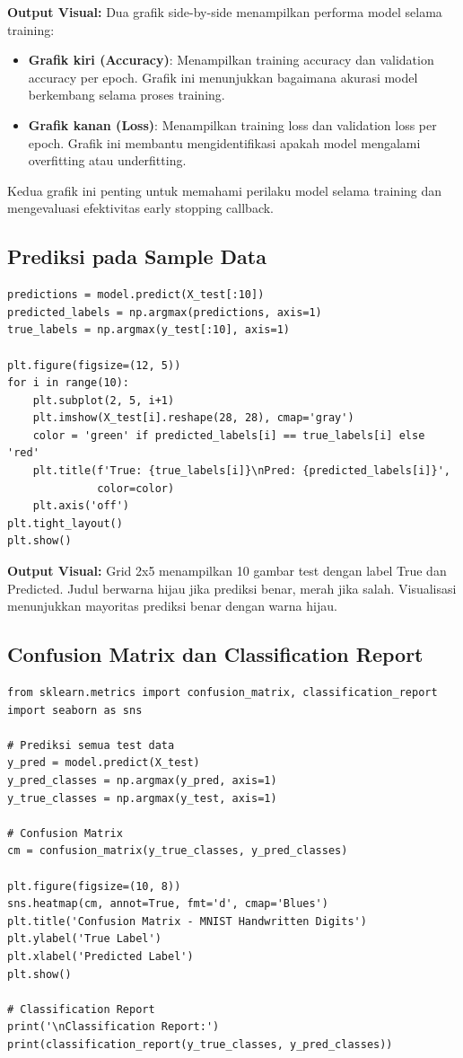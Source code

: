 \documentclass[12pt,a4paper]{article}
\begin{document}
\textbf{Output Visual:} Dua grafik side-by-side menampilkan performa model selama training:
\begin{itemize}
    \item \textbf{Grafik kiri (Accuracy)}: Menampilkan training accuracy dan validation accuracy per epoch. Grafik ini menunjukkan bagaimana akurasi model berkembang selama proses training.
    \item \textbf{Grafik kanan (Loss)}: Menampilkan training loss dan validation loss per epoch. Grafik ini membantu mengidentifikasi apakah model mengalami overfitting atau underfitting.
\end{itemize}

Kedua grafik ini penting untuk memahami perilaku model selama training dan mengevaluasi efektivitas early stopping callback.

\subsection{Prediksi pada Sample Data}

\begin{lstlisting}[caption=Visualisasi Prediksi]
predictions = model.predict(X_test[:10])
predicted_labels = np.argmax(predictions, axis=1)
true_labels = np.argmax(y_test[:10], axis=1)

plt.figure(figsize=(12, 5))
for i in range(10):
    plt.subplot(2, 5, i+1)
    plt.imshow(X_test[i].reshape(28, 28), cmap='gray')
    color = 'green' if predicted_labels[i] == true_labels[i] else 'red'
    plt.title(f'True: {true_labels[i]}\nPred: {predicted_labels[i]}', 
              color=color)
    plt.axis('off')
plt.tight_layout()
plt.show()
\end{lstlisting}

\textbf{Output Visual:} Grid 2x5 menampilkan 10 gambar test dengan label True dan Predicted. Judul berwarna hijau jika prediksi benar, merah jika salah. Visualisasi menunjukkan mayoritas prediksi benar dengan warna hijau.

\subsection{Confusion Matrix dan Classification Report}

\begin{lstlisting}[caption=Confusion Matrix dan Classification Report]
from sklearn.metrics import confusion_matrix, classification_report
import seaborn as sns

# Prediksi semua test data
y_pred = model.predict(X_test)
y_pred_classes = np.argmax(y_pred, axis=1)
y_true_classes = np.argmax(y_test, axis=1)

# Confusion Matrix
cm = confusion_matrix(y_true_classes, y_pred_classes)

plt.figure(figsize=(10, 8))
sns.heatmap(cm, annot=True, fmt='d', cmap='Blues')
plt.title('Confusion Matrix - MNIST Handwritten Digits')
plt.ylabel('True Label')
plt.xlabel('Predicted Label')
plt.show()

# Classification Report
print('\nClassification Report:')
print(classification_report(y_true_classes, y_pred_classes))
\end{lstlisting}
\end{document}

